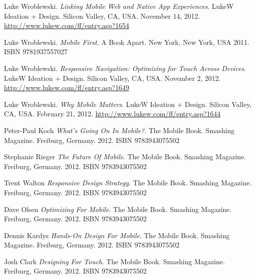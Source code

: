 \begin{thebibliography}{9}
  Luke Wroblewski.
  \emph{Linking Mobile Web and Native App Experiences}.
  LukeW Ideation + Design.
  Silicon Valley, CA, USA.
  November 14, 2012.
  \url{http://www.lukew.com/ff/entry.asp?1654}

  Luke Wroblewski.
  \emph{Mobile First}.
  A Book Apart.
  New York, New York, USA
  2011.
  ISBN 9781937557027

  Luke Wroblewski.
  \emph{Responsive Navigation: Optimizing for Touch Across Devices}.
  LukeW Ideation + Design.
  Silicon Valley, CA, USA.
  November 2, 2012.
  \url{http://www.lukew.com/ff/entry.asp?1649}

  Luke Wroblewski.
  \emph{Why Mobile Matters}.
  LukeW Ideation + Design.
  Silicon Valley, CA, USA.
  February 21, 2012.
  \url{http://www.lukew.com/ff/entry.asp?1644}

  Peter-Paul Koch
  \emph{What's Going On In Mobile?}.
  The Mobile Book.
  Smashing Magazine.
  Freiburg, Germany.
  2012.
  ISBN 9783943075502

  Stephanie Rieger
  \emph{The Future Of Mobile}.
  The Mobile Book.
  Smashing Magazine.
  Freiburg, Germany.
  2012.
  ISBN 9783943075502

  Trent Walton
  \emph{Responsive Design Strategy}.
  The Mobile Book.
  Smashing Magazine.
  Freiburg, Germany.
  2012.
  ISBN 9783943075502

  Dave Olsen
  \emph{Optimizing For Mobile}.
  The Mobile Book.
  Smashing Magazine.
  Freiburg, Germany.
  2012.
  ISBN 9783943075502

  Dennis Kardys
  \emph{Hands-On Design For Mobile}.
  The Mobile Book.
  Smashing Magazine.
  Freiburg, Germany.
  2012.
  ISBN 9783943075502

  Josh Clark
  \emph{Designing For Touch}.
  The Mobile Book.
  Smashing Magazine.
  Freiburg, Germany.
  2012.
  ISBN 9783943075502
  

\end{thebibliography}